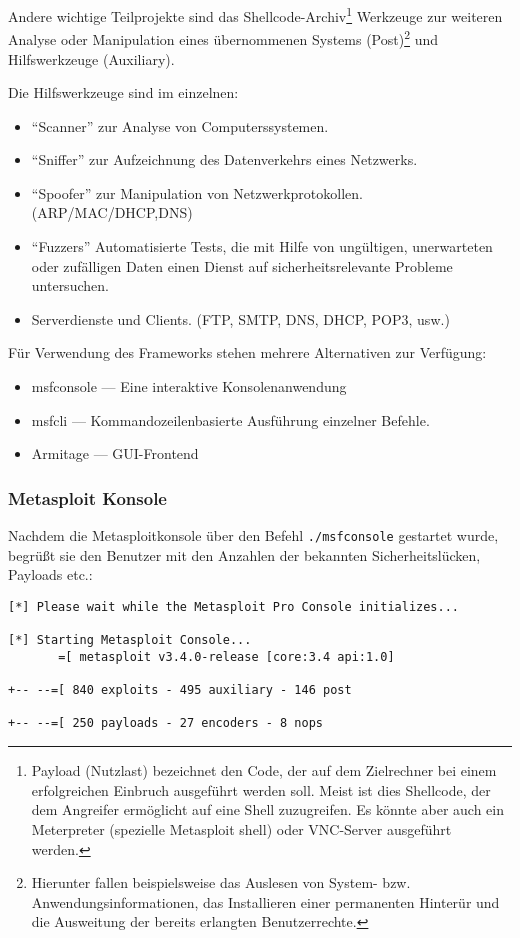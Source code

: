 Andere wichtige Teilprojekte sind das Shellcode-Archiv\footnote{Payload
  (Nutzlast) bezeichnet den Code, der auf dem Zielrechner bei einem
  erfolgreichen Einbruch ausgeführt werden soll. Meist ist dies Shellcode, der
  dem Angreifer ermöglicht auf eine Shell zuzugreifen. Es könnte aber auch ein
  Meterpreter (spezielle Metasploit shell) oder VNC-Server ausgeführt werden.}
Werkzeuge zur weiteren Analyse oder Manipulation eines übernommenen Systems
(Post)\footnote{Hierunter fallen beispielsweise das Auslesen von System-
  bzw. Anwendungsinformationen, das Installieren einer permanenten Hinterür und
  die Ausweitung der bereits erlangten Benutzerrechte.} und Hilfswerkzeuge
(Auxiliary).

Die Hilfswerkzeuge sind im einzelnen:

\begin{itemize}
  \item ``Scanner'' zur Analyse von Computerssystemen.
  \item ``Sniffer'' zur Aufzeichnung des Datenverkehrs eines Netzwerks.
  \item ``Spoofer'' zur Manipulation von Netzwerkprotokollen. (ARP/MAC/DHCP,DNS)
  \item ``Fuzzers'' Automatisierte Tests, die mit Hilfe von ungültigen,
    unerwarteten oder zufälligen Daten einen Dienst auf sicherheitsrelevante
    Probleme untersuchen.
  \item Serverdienste und Clients. (FTP, SMTP, DNS, DHCP, POP3, usw.)
\end{itemize}

Für Verwendung des Frameworks stehen mehrere Alternativen zur Verfügung:

\begin{itemize}
  \item msfconsole --- Eine interaktive Konsolenanwendung
  \item msfcli     --- Kommandozeilenbasierte Ausführung einzelner Befehle.
  \item Armitage   --- GUI-Frontend
\end{itemize}

\subsubsection{Metasploit Konsole}

Nachdem die Metasploitkonsole über den Befehl \lstinline{./msfconsole} gestartet
wurde, begrüßt sie den Benutzer mit den Anzahlen der bekannten
Sicherheitslücken, Payloads etc.:
\begin{lstlisting}[language=Metasploit]
[*] Please wait while the Metasploit Pro Console initializes...

[*] Starting Metasploit Console...
       =[ metasploit v3.4.0-release [core:3.4 api:1.0]

+-- --=[ 840 exploits - 495 auxiliary - 146 post

+-- --=[ 250 payloads - 27 encoders - 8 nops
\end{lstlisting}


